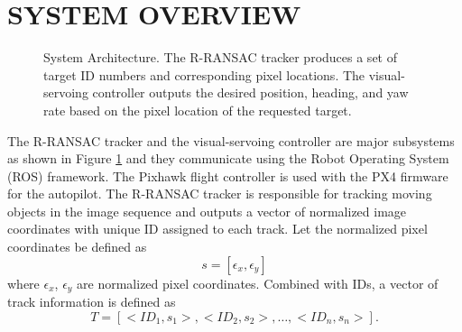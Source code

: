 \documentclass[letterpaper, 10 pt, conference]{ieeeconf}  %
\begin{document}
\section{SYSTEM OVERVIEW}

\begin{figure}[thpb]
	\centering
	\caption{System Architecture. The R-RANSAC tracker produces a set of target ID numbers and corresponding pixel locations. The visual-servoing controller outputs the desired position, heading, and yaw rate based on the pixel location of the requested target.}
	\label{system}
\end{figure}

The R-RANSAC tracker and the visual-servoing controller are major subsystems as shown in Figure \ref{system} and they communicate using the Robot Operating System (ROS) framework. The Pixhawk flight controller is used with the PX4 firmware for the autopilot. The R-RANSAC tracker is responsible for tracking moving objects in the image sequence and outputs a vector of normalized image coordinates with unique ID assigned to each track. Let the normalized pixel coordinates be defined as 
\begin{equation}
	s = [\epsilon_x, \epsilon_y]
\end{equation} where $\epsilon_x$, $\epsilon_y$ are normalized pixel coordinates. Combined with IDs, a vector of track information is defined as 
\begin{equation}
	T = [<ID_1, s_1>, <ID_2, s_2>, \dots, <ID_n, s_n>].
\end{equation}
	
\end{document}

